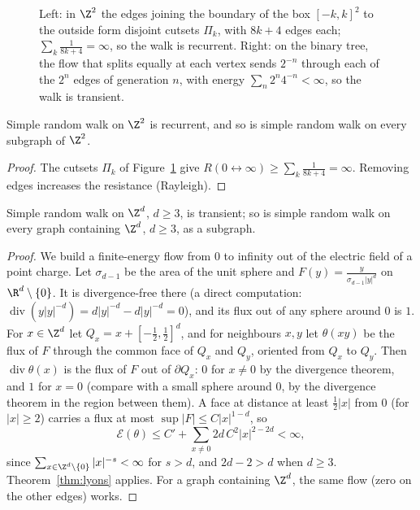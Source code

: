 \begin{figure}[ht]
\centering
{}
\caption{Left: in $\Z^2$ the edges joining the boundary of the box $[-k,k]^2$ to the outside form disjoint cutsets $\Pi_k$, with $8k+4$ edges each; $\sum_k\frac1{8k+4}=\infty$, so the walk is recurrent. Right: on the binary tree, the
flow that splits equally at each vertex sends $2^{-n}$ through each of the $2^n$ edges of generation $n$, with energy $\sum_n2^n4^{-n}<\infty$, so the walk is transient.}
\label{fig:cuts}
\end{figure}

\begin{corollary}\label{cor:z2rec}
Simple random walk on $\Z^2$ is recurrent, and so is simple random walk on every subgraph of $\Z^2$.
\end{corollary}

\begin{proof}
The cutsets $\Pi_k$ of Figure~\ref{fig:cuts} give $R(0\leftrightarrow\infty)\ge\sum_k\frac1{8k+4}=\infty$. Removing edges increases the resistance (Rayleigh).
\end{proof}

\begin{theorem}\label{thm:zdtransient}
Simple random walk on $\Z^d$, $d\ge3$, is transient; so is simple random walk on every graph containing $\Z^d$, $d\ge3$, as a subgraph.
\end{theorem}

\begin{proof}
We build a finite-energy flow from $0$ to infinity out of the electric field of a point charge. Let $\sigma_{d-1}$ be the area of the unit sphere and $F(y)=\frac{y}{\sigma_{d-1}|y|^d}$ on $\R^d\setminus\{0\}$. It is
divergence-free there (a direct computation: $\operatorname{div}(y|y|^{-d})=d|y|^{-d}-d|y|^{-d}=0$), and its flux out of any sphere around $0$ is $1$. For $x\in\Z^d$ let $Q_x=x+[-\frac12,\frac12]^d$, and for neighbours $x,y$ let $\theta(xy)$ be
the flux of $F$ through the common face of $Q_x$ and $Q_y$, oriented from $Q_x$ to $Q_y$. Then $\operatorname{div}\theta(x)$ is the flux of $F$ out of $\partial Q_x$: $0$ for $x\ne0$ by the divergence theorem, and $1$ for $x=0$ (compare with a small
sphere around $0$, by the divergence theorem in the region between them). A face at distance at least $\frac12|x|$ from $0$ (for $|x|\ge2$) carries a flux at most $\sup|F|\le C|x|^{1-d}$, so
\[
\mathcal E(\theta)\le C'+\sum_{x\ne0}2d\,C^2|x|^{2-2d}<\infty ,
\]
since $\sum_{x\in\Z^d\setminus\{0\}}|x|^{-s}<\infty$ for $s>d$, and $2d-2>d$ when $d\ge3$. Theorem~\ref{thm:lyons} applies. For a graph containing $\Z^d$, the same flow (zero on the other edges) works.
\end{proof}


